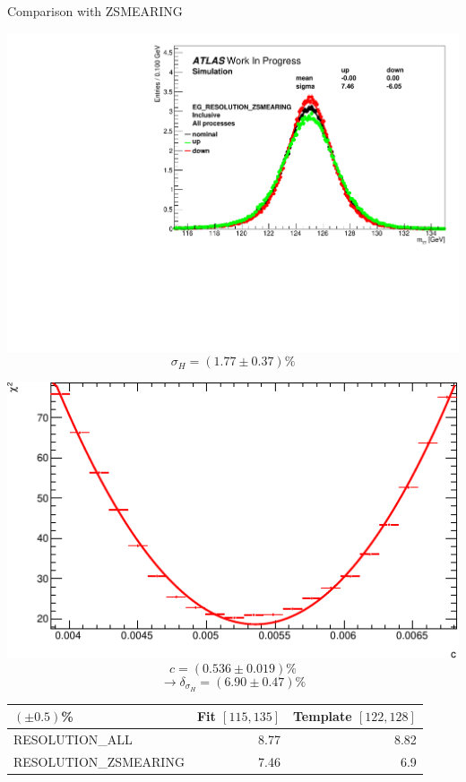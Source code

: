 \documentclass[a4paper]{beamer}
\begin{document}
\begin{frame}{Comparison with ZSMEARING}
  \begin{minipage}{0.49\linewidth}
    \includegraphics[width=\linewidth]{plots/h013_EG_RESOLUTION_ZSMEARING_0_125135.pdf}
    $$\sigma_H = (1.77 \pm 0.37)\%$$
  \end{minipage}
  \hfill
  \begin{minipage}{0.49\linewidth}
        \includegraphics[width=\linewidth]{plots/h013_EG_RESOLUTION_ZSMEARING__1up_0_scale.pdf}
    $$c=(0.536 \pm 0.019) \%$$$$\rightarrow \delta_{\sigma_H} = (6.90 \pm 0.47)\%$$
  \end{minipage}
  \begin{center}
    \begin{tabular}{|l|r|r|}
      \hline
    $(\pm 0.5)$\% &Fit $[115, 135]$& Template $[122, 128]$\\
    \hline
    RESOLUTION\_ALL & 8.77 & 8.82\\
    RESOLUTION\_ZSMEARING & 7.46 &6.9\\
    \hline
    \end{tabular}

\end{center}
\end{frame}
\end{document}

